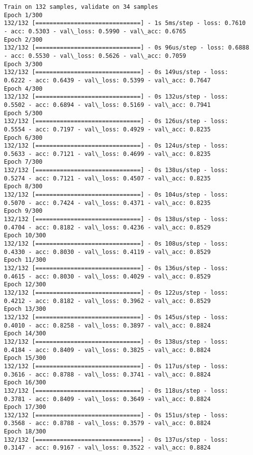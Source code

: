 \documentclass[11pt]{article}
\begin{document}
    \begin{Verbatim}[commandchars=\\\{\}]
Train on 132 samples, validate on 34 samples
Epoch 1/300
132/132 [==============================] - 1s 5ms/step - loss: 0.7610 - acc: 0.5303 - val\_loss: 0.5990 - val\_acc: 0.6765
Epoch 2/300
132/132 [==============================] - 0s 96us/step - loss: 0.6888 - acc: 0.5530 - val\_loss: 0.5626 - val\_acc: 0.7059
Epoch 3/300
132/132 [==============================] - 0s 149us/step - loss: 0.6222 - acc: 0.6439 - val\_loss: 0.5399 - val\_acc: 0.7647
Epoch 4/300
132/132 [==============================] - 0s 132us/step - loss: 0.5502 - acc: 0.6894 - val\_loss: 0.5169 - val\_acc: 0.7941
Epoch 5/300
132/132 [==============================] - 0s 126us/step - loss: 0.5554 - acc: 0.7197 - val\_loss: 0.4929 - val\_acc: 0.8235
Epoch 6/300
132/132 [==============================] - 0s 124us/step - loss: 0.5633 - acc: 0.7121 - val\_loss: 0.4699 - val\_acc: 0.8235
Epoch 7/300
132/132 [==============================] - 0s 138us/step - loss: 0.5274 - acc: 0.7121 - val\_loss: 0.4507 - val\_acc: 0.8235
Epoch 8/300
132/132 [==============================] - 0s 104us/step - loss: 0.5070 - acc: 0.7424 - val\_loss: 0.4371 - val\_acc: 0.8235
Epoch 9/300
132/132 [==============================] - 0s 138us/step - loss: 0.4704 - acc: 0.8182 - val\_loss: 0.4236 - val\_acc: 0.8529
Epoch 10/300
132/132 [==============================] - 0s 108us/step - loss: 0.4330 - acc: 0.8030 - val\_loss: 0.4119 - val\_acc: 0.8529
Epoch 11/300
132/132 [==============================] - 0s 136us/step - loss: 0.4615 - acc: 0.8030 - val\_loss: 0.4029 - val\_acc: 0.8529
Epoch 12/300
132/132 [==============================] - 0s 122us/step - loss: 0.4212 - acc: 0.8182 - val\_loss: 0.3962 - val\_acc: 0.8529
Epoch 13/300
132/132 [==============================] - 0s 145us/step - loss: 0.4010 - acc: 0.8258 - val\_loss: 0.3897 - val\_acc: 0.8824
Epoch 14/300
132/132 [==============================] - 0s 138us/step - loss: 0.4184 - acc: 0.8409 - val\_loss: 0.3825 - val\_acc: 0.8824
Epoch 15/300
132/132 [==============================] - 0s 117us/step - loss: 0.3616 - acc: 0.8788 - val\_loss: 0.3741 - val\_acc: 0.8824
Epoch 16/300
132/132 [==============================] - 0s 118us/step - loss: 0.3781 - acc: 0.8409 - val\_loss: 0.3649 - val\_acc: 0.8824
Epoch 17/300
132/132 [==============================] - 0s 151us/step - loss: 0.3568 - acc: 0.8788 - val\_loss: 0.3579 - val\_acc: 0.8824
Epoch 18/300
132/132 [==============================] - 0s 137us/step - loss: 0.3147 - acc: 0.9167 - val\_loss: 0.3522 - val\_acc: 0.8824

\end{Verbatim}
\end{document}
